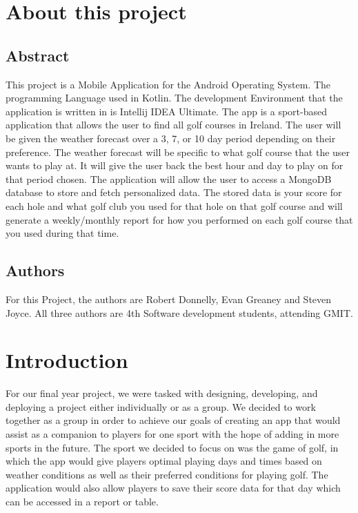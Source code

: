 \chapter{About this project}
\section{Abstract}
This project is a Mobile Application for the Android Operating System. The programming Language used in Kotlin. The development Environment that the application is written in is Intellij IDEA Ultimate.\newline
The app is a sport-based application that allows the user to find all golf courses in Ireland. The user will be given the weather forecast over a 3, 7, or 10 day period depending on their preference. The weather forecast will be specific to what golf course that the user wants to play at. It will give the user back the best hour and day to play on for that period chosen.\newline
The application will allow the user to access a MongoDB database to store and fetch personalized data. The stored data is your score for each hole and what golf club you used for that hole on that golf course and will generate a weekly/monthly report for how you performed on each golf course that you used during that time.\newline
\section{Authors}
For this Project, the authors are Robert Donnelly, Evan Greaney and Steven Joyce. All three authors are 4th Software development students, attending GMIT.
\chapter{Introduction}
For our final year project, we were tasked with designing, developing, and deploying a project either individually or as a group. We decided to work together as a group in order to achieve our goals of creating an app that would assist as a companion to players for one sport with the hope of adding in more sports in the future. The sport we decided to focus on was the game of golf, in which the app would give players optimal playing days and times based on weather conditions as well as their preferred conditions for playing golf. The application would also allow players to save their score data for that day which can be accessed in a report or table.

